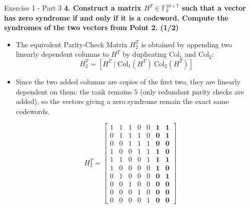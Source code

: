 \documentclass[10pt, aspectratio=169]{beamer}
\newcommand{\question}[1]{{\color{QuestionRed}\textbf{#1}}}
\begin{document}
\begin{frame}{Exercise 1 - Part 3}
	\question{4. Construct a matrix $H^T \in \mathbb{F}_2^{10 \times 7}$ such that a vector has zero syndrome if and only if it is a codeword. Compute the syndromes of the two vectors from Point 2. (1/2)}
	
	\vspace{0.1cm}
	\begin{itemize}
		\item The equivalent Parity-Check Matrix $H_2^T$ is obtained by appending two linearly dependent columns to $H^T$ by duplicating $\text{Col}_1$ and $\text{Col}_2$:
		\[
		H_2^T = \left[ H^T \mid \text{Col}_1(H^T)\ \text{Col}_2(H^T) \right]
		\]
		\item Since the two added columns are copies of the first two, they are linearly dependent on them: the rank remains $5$ (only redundant parity checks are added), so the vectors giving a zero syndrome remain the exact same codewords.
	\end{itemize}
	{\footnotesize
		\renewcommand{\arraystretch}{0.84}
		\[
		H_2^T = \begin{bmatrix}
			1 & 1 & 1 & 0 & 0 & \mathbf{1} & \mathbf{1} \\
			0 & 1 & 1 & 1 & 0 & \mathbf{0} & \mathbf{1} \\
			0 & 0 & 1 & 1 & 1 & \mathbf{0} & \mathbf{0} \\
			1 & 0 & 0 & 1 & 1 & \mathbf{1} & \mathbf{0} \\
			1 & 1 & 0 & 0 & 1 & \mathbf{1} & \mathbf{1} \\
			1 & 0 & 0 & 0 & 0 & \mathbf{1} & \mathbf{0} \\
			0 & 1 & 0 & 0 & 0 & \mathbf{0} & \mathbf{1} \\
			0 & 0 & 1 & 0 & 0 & \mathbf{0} & \mathbf{0} \\
			0 & 0 & 0 & 1 & 0 & \mathbf{0} & \mathbf{0} \\
			0 & 0 & 0 & 0 & 1 & \mathbf{0} & \mathbf{0}
		\end{bmatrix}
		\]
	}
\end{frame}
\end{document}

